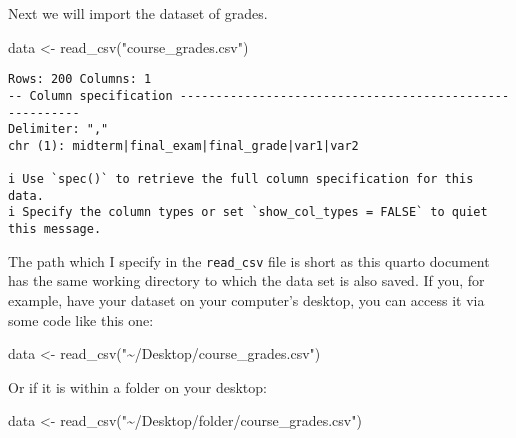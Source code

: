 \documentclass[
  letterpaper,
  DIV=11,
  numbers=noendperiod]{scrreprt}
\newenvironment{Shaded}{\begin{snugshade}}{\end{snugshade}}
\newcommand{\FunctionTok}[1]{\textcolor[rgb]{0.28,0.35,0.67}{#1}}
\newcommand{\NormalTok}[1]{\textcolor[rgb]{0.00,0.23,0.31}{#1}}
\newcommand{\OtherTok}[1]{\textcolor[rgb]{0.00,0.23,0.31}{#1}}
\newcommand{\StringTok}[1]{\textcolor[rgb]{0.13,0.47,0.30}{#1}}
\begin{document}
Next we will import the dataset of grades.

\begin{Shaded}
\begin{Highlighting}[]
\NormalTok{data }\OtherTok{\textless{}{-}} \FunctionTok{read\_csv}\NormalTok{(}\StringTok{"course\_grades.csv"}\NormalTok{)}
\end{Highlighting}
\end{Shaded}

\begin{verbatim}
Rows: 200 Columns: 1
-- Column specification --------------------------------------------------------
Delimiter: ","
chr (1): midterm|final_exam|final_grade|var1|var2

i Use `spec()` to retrieve the full column specification for this data.
i Specify the column types or set `show_col_types = FALSE` to quiet this message.
\end{verbatim}

The path which I specify in the \texttt{read\_csv} file is short as this
quarto document has the same working directory to which the data set is
also saved. If you, for example, have your dataset on your computer's
desktop, you can access it via some code like this one:

\begin{Shaded}
\begin{Highlighting}[]
\NormalTok{data }\OtherTok{\textless{}{-}} \FunctionTok{read\_csv}\NormalTok{(}\StringTok{"\textasciitilde{}/Desktop/course\_grades.csv"}\NormalTok{)}
\end{Highlighting}
\end{Shaded}

Or if it is within a folder on your desktop:

\begin{Shaded}
\begin{Highlighting}[]
\NormalTok{data }\OtherTok{\textless{}{-}} \FunctionTok{read\_csv}\NormalTok{(}\StringTok{"\textasciitilde{}/Desktop/folder/course\_grades.csv"}\NormalTok{)}
\end{Highlighting}
\end{Shaded}
\end{document}
